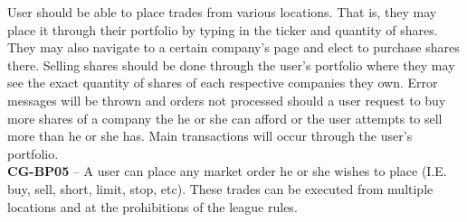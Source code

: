 User should be able to place trades from various locations. That is, they may place it through
their portfolio by typing in the ticker and quantity of shares. They may also navigate to a
certain company’s page and elect to purchase shares there. Selling shares should be done
through the user’s portfolio where they may see the exact quantity of shares of each respective
companies they own. Error messages will be thrown and orders not processed should a user request
to buy more shares of a company the he or she can afford or the user attempts to sell more than
he or she has. Main transactions will occur through the user’s portfolio. \\

\textbf{CG-BP05} – A user can place any market order he or she wishes to place (I.E. buy,
sell, short, limit, stop, etc). These trades can be executed from multiple locations and
at the prohibitions of the league rules. \\

